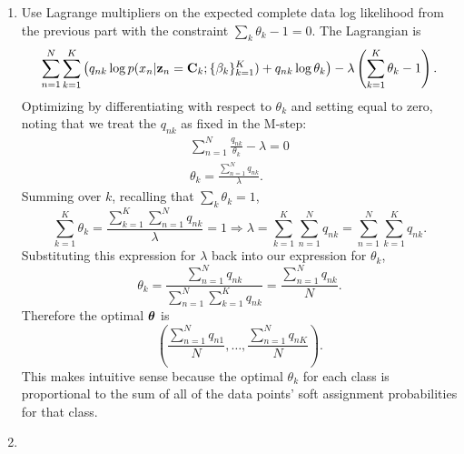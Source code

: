 \documentclass[submit]{harvardml}
\begin{document}
\begin{enumerate}
\begin{enumerate}
      \item Use Lagrange multipliers on the expected complete data log likelihood from the previous part with the constraint $\sum_k \theta_k - 1 = 0$. The Lagrangian is
      $$\sum_{n=1}^N \sum_{k=1}^K \left(q_{nk} \log p(x_n|\mathbf{z}_n = \mathbf{C}_k; \{\beta_k\}^K_{k=1}) + q_{nk} \log \theta_k\right) - \lambda\left(\sum_{k=1}^K \theta_k - 1\right).$$
      Optimizing by differentiating with respect to $\theta_k$ and setting equal to zero, noting that we treat the $q_{nk}$ as fixed in the M-step:
	  \begin{align*}
		\sum_{n=1}^N \frac{q_{nk}}{\theta_k} - \lambda = 0 \\
	  	\theta_k = \frac{\sum_{n=1}^N q_{nk}}{\lambda}.
	  \end{align*}
  	  Summing over $k$, recalling that $\sum_k \theta_k = 1$,
  	  	$$\sum_{k=1}^K \theta_k = \frac{\sum_{k=1}^K \sum_{n=1}^N q_{nk}}{\lambda} = 1 \Rightarrow \lambda = \sum_{k=1}^K \sum_{n=1}^N q_{nk} = \sum_{n=1}^N \sum_{k=1}^K q_{nk}.$$
 	Substituting this expression for $\lambda$ back into our expression for $\theta_k$,
 	$$\theta_k = \frac{\sum_{n=1}^N q_{nk}}{\sum_{n=1}^N \sum_{k=1}^K q_{nk}} = \frac{\sum_{n=1}^N q_{nk}}{N}.$$
 	Therefore the optimal $\boldsymbol{\theta}$ is
 	$$\left(\frac{\sum_{n=1}^N q_{n1}}{N}, \ldots, \frac{\sum_{n=1}^N q_{nK}}{N}\right).$$
 	This makes intuitive sense because the optimal $\theta_k$ for each class is proportional to the sum of all of the data points' soft assignment probabilities for that class.
 	
      \item 
      

  

\end{enumerate}
\end{enumerate}
\end{document}
